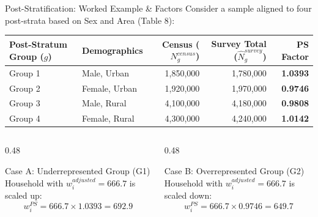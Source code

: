\documentclass[10pt, aspectratio=169]{beamer}
\begin{document}
\begin{frame}{Post-Stratification: Worked Example \& Factors}
  Consider a sample aligned to four post-strata based on Sex and Area (Table 8):
  
  \begin{table}
    \centering
    \footnotesize
    \begin{tabular}{llrrr}
      \toprule
      \textbf{Post-Stratum Group ($g$)} & \textbf{Demographics} & \textbf{Census ($N_g^{census}$)} & \textbf{Survey Total ($\hat{N}_g^{survey}$)} & \textbf{PS Factor} \\
      \midrule
      Group 1 & Male, Urban & 1,850,000 & 1,780,000 & \textbf{1.0393} \\
      Group 2 & Female, Urban & 1,920,000 & 1,970,000 & \textbf{0.9746} \\
      Group 3 & Male, Rural & 4,100,000 & 4,180,000 & \textbf{0.9808} \\
      Group 4 & Female, Rural & 4,300,000 & 4,240,000 & \textbf{1.0142} \\
      \bottomrule
    \end{tabular}
  \end{table}

  \begin{columns}[T]
    \begin{column}{0.48\textwidth}
      \begin{block}{Case A: Underrepresented Group (G1)}
        Household with $w_i^{adjusted} = 666.7$ is scaled up:
        $$w_i^{PS} = 666.7 \times 1.0393 = \mathbf{692.9}$$
      \end{block}
    \end{column}
    \begin{column}{0.48\textwidth}
      \begin{block}{Case B: Overrepresented Group (G2)}
        Household with $w_i^{adjusted} = 666.7$ is scaled down:
        $$w_i^{PS} = 666.7 \times 0.9746 = \mathbf{649.7}$$
      \end{block}
    \end{column}
  \end{columns}
\end{frame}
\end{document}
